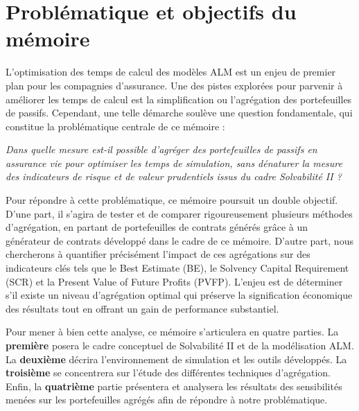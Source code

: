 \section{Problématique et objectifs du mémoire}

L'optimisation des temps de calcul des modèles ALM est un enjeu de premier plan pour les compagnies d'assurance. Une des pistes explorées pour parvenir à améliorer les temps de calcul est la simplification ou l'agrégation des portefeuilles de passifs. Cependant, une telle démarche soulève une question fondamentale, qui constitue la problématique centrale de ce mémoire :

\begin{center}
\textit{Dans quelle mesure est-il possible d'agréger des portefeuilles de passifs en assurance vie pour optimiser les temps de simulation, sans dénaturer la mesure des indicateurs de risque et de valeur prudentiels issus du cadre Solvabilité II ?}
\end{center}

Pour répondre à cette problématique, ce mémoire poursuit un double objectif. D'une part, il s'agira de tester et de comparer rigoureusement plusieurs méthodes d'agrégation, en partant de portefeuilles de contrats générés grâce à un générateur de contrats développé dans le cadre de ce mémoire. D'autre part, nous chercherons à quantifier précisément l'impact de ces agrégations sur des indicateurs clés tels que le Best Estimate (BE), le Solvency Capital Requirement (SCR) et la Present Value of Future Profits (PVFP). L'enjeu est de déterminer s'il existe un niveau d'agrégation optimal qui préserve la signification économique des résultats tout en offrant un gain de performance substantiel.

Pour mener à bien cette analyse, ce mémoire s'articulera en quatre parties. La \textbf{première} posera le cadre conceptuel de Solvabilité II et de la modélisation ALM. La \textbf{deuxième} décrira l'environnement de simulation et les outils développés. La \textbf{troisième} se concentrera sur l'étude des différentes techniques d'agrégation. Enfin, la \textbf{quatrième} partie présentera et analysera les résultats des sensibilités menées sur les portefeuilles agrégés afin de répondre à notre problématique.